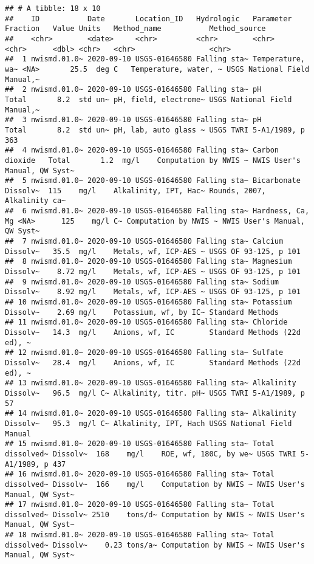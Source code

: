 \documentclass[
]{article}
\begin{document}
\begin{verbatim}
## # A tibble: 18 x 10
##    ID           Date       Location_ID   Hydrologic   Parameter        Fraction   Value Units   Method_name           Method_source               
##    <chr>        <date>     <chr>         <chr>        <chr>            <chr>      <dbl> <chr>   <chr>                 <chr>                       
##  1 nwismd.01.0~ 2020-09-10 USGS-01646580 Falling sta~ Temperature, wa~ <NA>       25.5  deg C   Temperature, water, ~ USGS National Field Manual,~
##  2 nwismd.01.0~ 2020-09-10 USGS-01646580 Falling sta~ pH               Total       8.2  std un~ pH, field, electrome~ USGS National Field Manual,~
##  3 nwismd.01.0~ 2020-09-10 USGS-01646580 Falling sta~ pH               Total       8.2  std un~ pH, lab, auto glass ~ USGS TWRI 5-A1/1989, p 363  
##  4 nwismd.01.0~ 2020-09-10 USGS-01646580 Falling sta~ Carbon dioxide   Total       1.2  mg/l    Computation by NWIS ~ NWIS User's Manual, QW Syst~
##  5 nwismd.01.0~ 2020-09-10 USGS-01646580 Falling sta~ Bicarbonate      Dissolv~  115    mg/l    Alkalinity, IPT, Hac~ Rounds, 2007, Alkalinity ca~
##  6 nwismd.01.0~ 2020-09-10 USGS-01646580 Falling sta~ Hardness, Ca, Mg <NA>      125    mg/l C~ Computation by NWIS ~ NWIS User's Manual, QW Syst~
##  7 nwismd.01.0~ 2020-09-10 USGS-01646580 Falling sta~ Calcium          Dissolv~   35.5  mg/l    Metals, wf, ICP-AES ~ USGS OF 93-125, p 101       
##  8 nwismd.01.0~ 2020-09-10 USGS-01646580 Falling sta~ Magnesium        Dissolv~    8.72 mg/l    Metals, wf, ICP-AES ~ USGS OF 93-125, p 101       
##  9 nwismd.01.0~ 2020-09-10 USGS-01646580 Falling sta~ Sodium           Dissolv~    8.92 mg/l    Metals, wf, ICP-AES ~ USGS OF 93-125, p 101       
## 10 nwismd.01.0~ 2020-09-10 USGS-01646580 Falling sta~ Potassium        Dissolv~    2.69 mg/l    Potassium, wf, by IC~ Standard Methods            
## 11 nwismd.01.0~ 2020-09-10 USGS-01646580 Falling sta~ Chloride         Dissolv~   14.3  mg/l    Anions, wf, IC        Standard Methods (22d ed), ~
## 12 nwismd.01.0~ 2020-09-10 USGS-01646580 Falling sta~ Sulfate          Dissolv~   28.4  mg/l    Anions, wf, IC        Standard Methods (22d ed), ~
## 13 nwismd.01.0~ 2020-09-10 USGS-01646580 Falling sta~ Alkalinity       Dissolv~   96.5  mg/l C~ Alkalinity, titr. pH~ USGS TWRI 5-A1/1989, p 57   
## 14 nwismd.01.0~ 2020-09-10 USGS-01646580 Falling sta~ Alkalinity       Dissolv~   95.3  mg/l C~ Alkalinity, IPT, Hach USGS National Field Manual  
## 15 nwismd.01.0~ 2020-09-10 USGS-01646580 Falling sta~ Total dissolved~ Dissolv~  168    mg/l    ROE, wf, 180C, by we~ USGS TWRI 5-A1/1989, p 437  
## 16 nwismd.01.0~ 2020-09-10 USGS-01646580 Falling sta~ Total dissolved~ Dissolv~  166    mg/l    Computation by NWIS ~ NWIS User's Manual, QW Syst~
## 17 nwismd.01.0~ 2020-09-10 USGS-01646580 Falling sta~ Total dissolved~ Dissolv~ 2510    tons/d~ Computation by NWIS ~ NWIS User's Manual, QW Syst~
## 18 nwismd.01.0~ 2020-09-10 USGS-01646580 Falling sta~ Total dissolved~ Dissolv~    0.23 tons/a~ Computation by NWIS ~ NWIS User's Manual, QW Syst~
\end{verbatim}
\end{document}
